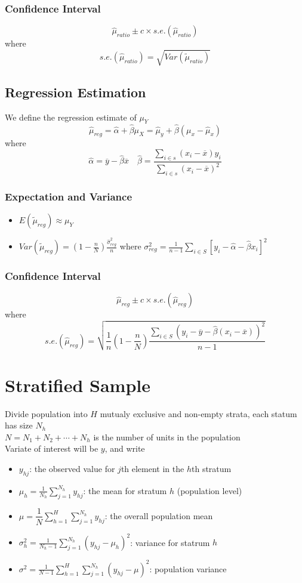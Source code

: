 \documentclass[11pt]{article}
\newcommand{\ds}{\displaystyle}
\begin{document}
\subsubsection{Confidence Interval}
\[\hat{\mu}_{ratio}\pm c\times s.e.(\hat{\mu}_{ratio})\]
where \[s.e.(\hat{\mu}_{ratio})=\sqrt{Var(\tilde{\mu}_{ratio})}\]
\subsection{Regression Estimation}
We define the regression estimate of $\mu_Y$ 
\[\hat{\mu}_{reg}=\hat{\alpha}+\hat{\beta}\mu_X = \hat{\mu}_y+\hat{\beta}(\mu_x-\hat{\mu}_x)\]
where \[\hat{\alpha}=\overline{y}-\hat{\beta}\overline{x}\quad\hat{\beta} = \frac{\sum_{i\in s}(x_i-\overline{x})y_i}{\sum_{i\in s}(x_i-\overline{x})^2}\]
\subsubsection{Expectation and Variance}
\begin{itemize}
    \item $E(\tilde{\mu}_{reg})\approx\mu_Y$
    \item $Var(\tilde{\mu}_{reg})=(1-\frac{n}{N})\frac{\hat{\sigma}^2_{reg}}{n}$ where $\sigma^2_{reg}=\frac{1}{n-1}\sum_{i\in S}[y_i-\hat{\alpha}-\hat{\beta}x_i]^2$
\end{itemize}
\subsubsection{Confidence Interval}
\[\hat{\mu}_{reg}\pm c\times s.e.(\hat{\mu}_{reg})\]
where \[s.e.(\hat{\mu}_{reg})=\sqrt{\frac{1}{n}(1-\frac{n}{N})\frac{\sum_{i\in S}(y_i-\overline{y}-\hat{\beta}(x_i-\overline{x}))^2}{n-1}}\]

\section{Stratified Sample}
Divide population into $H$ mutualy exclusive and non-empty strata, each statum has size $N_h$ \\
$N=N_1+N_2+\cdots+N_h$ is the number of units in the population \\
Variate of interest will be $y$, and write 
\begin{itemize}
    \item $y_{hj}$: the observed value for $j$th element in the $h$th stratum
    \item $\mu_h=\ds\frac{1}{N_h}\sum_{j=1}^{N_h}y_{hj}$: the mean for stratum $h$ (population level)
    \item $\mu = \ds\dfrac{1}{N}\sum_{h=1}^{H}\sum_{j=1}^{N_h}y_{hj}$: the overall population mean
    \item $\sigma^2_h=\ds\frac{1}{N_h-1}\sum_{j=1}^{N_h}(y_{hj}-\mu_h)^2$: variance for statrum $h$
    \item $\sigma^2=\ds\frac{1}{N-1}\sum_{h=1}^{H}\sum_{j=1}^{N_h}(y_{hj}-\mu)^2$: population variance
\end{itemize}
\end{document}
